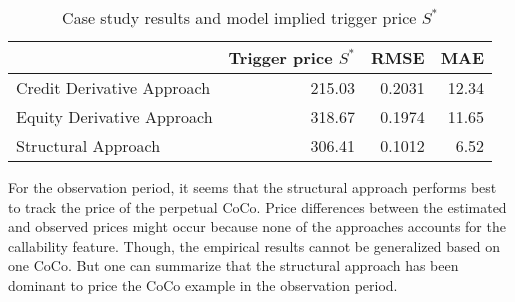 \begin{table}[H]
 \setlength{\extrarowheight}{2.5pt}
 \centering
 \begin{tabular}{lrrr}
  \toprule
    & \textbf{Trigger price $S^*$} & \textbf{RMSE} & \textbf{MAE} \\
  \midrule
   Credit Derivative Approach & 215.03 & 0.2031 & 12.34\\
   Equity Derivative Approach & 318.67 & 0.1974 & 11.65 \\   
   Structural Approach & 306.41 & 0.1012  & \phantom{1}6.52 \\
  \bottomrule
 \end{tabular}
 \caption[Case study results]{Case study results and model implied trigger price $S^*$}
 \label{tbl:valuationresults}
\end{table}

For the observation period, it seems that the structural approach performs best to track the price of the perpetual CoCo. Price differences between the estimated and observed prices might occur because none of the approaches accounts for the callability feature. Though, the empirical results cannot be generalized based on one CoCo. But one can summarize that the structural approach has been dominant to price the CoCo example in the observation period.
